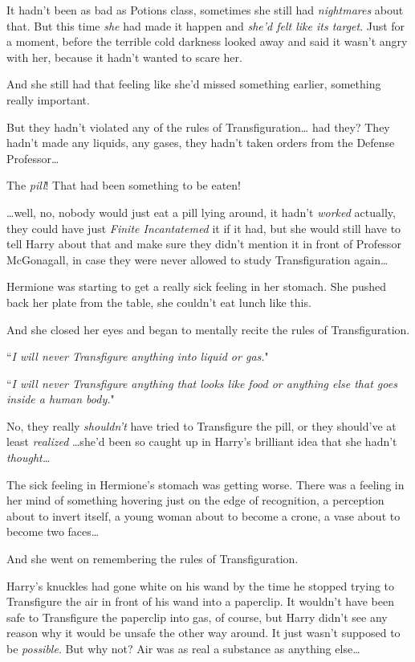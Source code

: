 It hadn't been as bad as Potions class, sometimes she still had \emph{nightmares} about that. But this time \emph{she} had made it happen and \emph{she'd felt like its target}. Just for a moment, before the terrible cold darkness looked away and said it wasn't angry with her, because it hadn't wanted to scare her.

And she still had that feeling like she'd missed something earlier, something really important.

But they hadn't violated any of the rules of Transfiguration{\ldots} had they? They hadn't made any liquids, any gases, they hadn't taken orders from the Defense Professor{\ldots}

The \emph{pill}! That had been something to be eaten!

{\ldots}well, no, nobody would just eat a pill lying around, it hadn't \emph{worked} actually, they could have just \emph{Finite Incantatemed} it if it had, but she would still have to tell Harry about that and make sure they didn't mention it in front of Professor McGonagall, in case they were never allowed to study Transfiguration again{\ldots}

Hermione was starting to get a really sick feeling in her stomach. She pushed back her plate from the table, she couldn't eat lunch like this.

And she closed her eyes and began to mentally recite the rules of Transfiguration.

``\emph{I will never Transfigure anything into liquid or gas.}"

``\emph{I will never Transfigure anything that looks like food or anything else that goes inside a human body.}"

No, they really \emph{shouldn't} have tried to Transfigure the pill, or they should've at least \emph{realized} {\ldots}she'd been so caught up in Harry's brilliant idea that she hadn't \emph{thought{\ldots}}

The sick feeling in Hermione's stomach was getting worse. There was a feeling in her mind of something hovering just on the edge of recognition, a perception about to invert itself, a young woman about to become a crone, a vase about to become two faces{\ldots}

And she went on remembering the rules of Transfiguration.

\later

Harry's knuckles had gone white on his wand by the time he stopped trying to Transfigure the air in front of his wand into a paperclip. It wouldn't have been safe to Transfigure the paperclip into gas, of course, but Harry didn't see any reason why it would be unsafe the other way around. It just wasn't supposed to be \emph{possible}. But why not? Air was as real a substance as anything else{\ldots}

